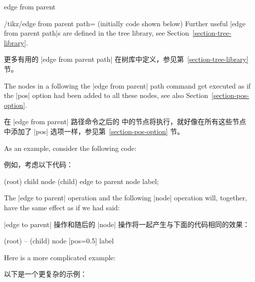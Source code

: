 \begin{pathoperation}{edge from parent}{}
\begin{enumerate}
\begin{key}{/tikz/edge from parent path= (initially \normalfont code shown below)}
                Further useful |edge from parent path|s are defined in the tree
                library, see Section~\ref{section-tree-library}.

                更多有用的 |edge from parent path| 在树库中定义，参见第~\ref{section-tree-library} 节。

                The nodes in a  following the
                |edge from parent| path command get executed as if the |pos|
                option had been added to all these nodes, see also
                Section~\ref{section-pos-option}.

                在 |edge from parent| 路径命令之后的  中的节点将执行，就好像在所有这些节点中添加了 |pos| 选项一样，参见第~\ref{section-pos-option} 节。

                As an example, consider the following code:

                例如，考虑以下代码：


\begin{codeexample}
\node (root) {} child {node (child) {} edge to parent node {label}};
\end{codeexample}
                
                The |edge to parent| operation and the following |node|
                operation will, together, have the same effect as if we had
                said:
                
                |edge to parent| 操作和随后的 |node| 操作将一起产生与下面的代码相同的效果：


\begin{codeexample}
(root) -- (child) node [pos=0.5] {label}
\end{codeexample}

                Here is a more complicated example:
                
                以下是一个更复杂的示例：


\begin{codeexample}[]
\end{codeexample}


\end{key}
\end{enumerate}
\end{pathoperation}
